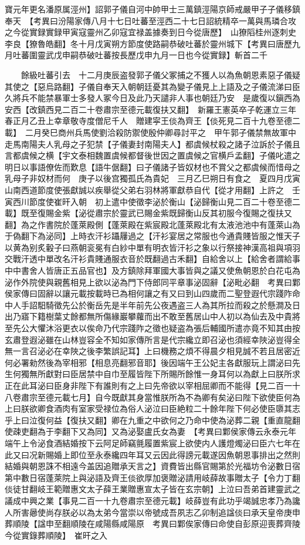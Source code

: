 寶元年更名潘原属涇州】詔郭子儀自河中帥甲士三萬鎮涇陽京師戒嚴甲子子儀移鎮奉天　【考異曰汾陽家傳八月十七日吐蕃至涇西二十七日詔統精卒一萬與馬璘合攻之今從實録實録甲寅寇靈州乙卯寇宜禄盖據奏到日今從唐歷】　山獠䧟桂州逐刺史李良【獠魯皓翻】冬十月戊寅朔方節度使路嗣恭破吐蕃於靈州城下【考異曰唐歷九月吐蕃圍靈武戊申嗣恭破吐蕃按長歷戊申九月一日也今從實録】斬首二千

　　餘級吐蕃引去　十二月庚辰盗發郭子儀父冢捕之不獲人以為魚朝恩素惡子儀疑其使之【惡烏路翻】子儀自奉天入朝朝廷憂其為變子儀見上上語及之子儀流涕曰臣久將兵不能禁暴軍士多發人冢今日及此乃天譴非人事也朝廷乃安　是歲復以鎭西為安西【改鎮西見二百二十卷肅宗至德元載復扶又翻】　新羅王憲英卒子乾運立三年春正月乙丑上幸章敬寺度僧尼千人　贈建寜王倓為齊王【倓死見二百十九卷至德二載】　二月癸巳商州兵馬使劉洽殺防禦使殷仲卿尋討平之　甲午郭子儀禁無故軍中走馬南陽夫人乳母之子犯禁【子儀妻封南陽夫人】都虞候杖殺之諸子泣訴於子儀且言都虞候之横【宇文泰相魏置虞候都督後世因之置虞候之官横戶孟翻】子儀叱遣之明日以事語僚佐而歎息【語牛倨翻】曰子儀諸子皆奴材也不賞父之都虞候而惜母之乳母子非奴材而何　庚子以後宫獨孤氏為貴妃　三月乙巳朔日有食之　夏四月戊寅山南西道節度使張獻誠以疾舉從父弟右羽林將軍獻恭自代【從才用翻】上許之　壬寅西川節度使崔旰入朝　初上遣中使徵李泌於衡山【泌歸衡山見二百二十卷至德二載】既至復賜金紫【泌從肅宗於靈武已賜金紫既歸衡山反其初服今復賜之復扶又翻】為之作書院於蓬萊殿側【蓬萊殿在紫宸殿北蓬萊殿北有太液池池中有蓬萊山為于偽翻下為泌同】上時衣汗衫躡屨過之【汗衫宴居之常服也今通貴賤皆服之惟天子以黄為别炙轂子曰燕朝衮冕有白紗中單有明衣皆汗衫之象以行祭接神漢高祖與項羽交戰汗透中單改名汗衫貴賤通服衣音於既翻過古禾翻】自給舍以上【給舍者謂給事中中書舍人皆唐正五品官也】及方鎮除拜軍國大事皆與之議又使魚朝恩於白花屯為泌作外院使與親舊相見上欲以泌為門下侍郎同平章事泌固辭【泌毗必翻　考異曰鄴侯家傳曰固辭以讓元載按載時已為相何讓之有又曰到山四歲而二聖登遐代宗踐阼命中人手詔馹騎徵先公於衡岳先是半年前先公夜遇盗三人為其所拉而殺之於懸澗及日出乃寤下籍樹葉丈餘都無所傷緣巖攀蘿而出不敢至舊居山中人初以為仙去及中貴將至先公大懼沐浴更衣以俟命乃代宗踐阼之徵也疑盗為張后輔國所遣亦竟不知其由按玄肅登遐泌雖在山林豈容全不知如家傳所言是代宗纔立即召泌也須經幸陜泌豈得全無一言召泌必在幸陜之後李繁誤記耳】上曰機務之煩不得晨夕相見誠不若且居密近何必署勑然後為宰相邪【相息亮翻邪音耶】後因端午王公妃主各獻服玩上謂泌曰先生何獨無所獻對曰臣居禁中自巾至履皆陛下所賜所餘惟一身耳何以為獻上曰朕所求正在此耳泌曰臣身非陛下有誰則有之上曰先帝欲以宰相屈卿而不能得【見二百一十八卷肅宗至德元載七月】自今既獻其身當惟朕所為不為卿有矣泌曰陛下欲使臣何為上曰朕欲卿食酒肉有室家受禄位為俗人泌泣曰臣絶粒二十餘年陛下何必使臣隳其志乎上曰泣復何益【復扶又翻】卿在九重之中欲何之乃命中使為泌葬二親【重直龍翻使疎吏翻為于李翻下又為同】又為泌娶盧氏女為妻　【考異曰鄴侯家傳云永泰元年端午上令泌食酒結婚按下云阿足師竊氈履置紫宸上欲使内人護燈燭泌曰臣六七年在此又曰况新賜婚上即位至永泰纔四年耳又云因此得謗元載遂因魚朝恩事排出之然則結婚與朝恩誅不相遠今盖因追贈承天言之】資費皆出縣官賜第於光福坊令泌數日宿第中數日宿蓬萊院上與泌語及齊王倓欲厚加褒贈泌請用岐薛故事贈太子【令力丁翻倓徒甘翻岐王範贈惠文太子薛王業贈惠宣太子皆在玄宗朝】上泣曰吾弟首建靈武之議成中興之業【事見二百一十九卷肅宗至德元載】岐薛豈有此功乎竭誠忠孝乃為讒人所害曏使尚存朕必以為太弟今當崇以帝號成吾夙志乙卯制追諡倓曰承天皇帝庚申葬順陵【諡申至翻順陵在咸陽縣咸陽原　考異曰鄴俟家傳曰命使自彭原迎喪葬齊陵今從實錄葬順陵】　崔旰之入